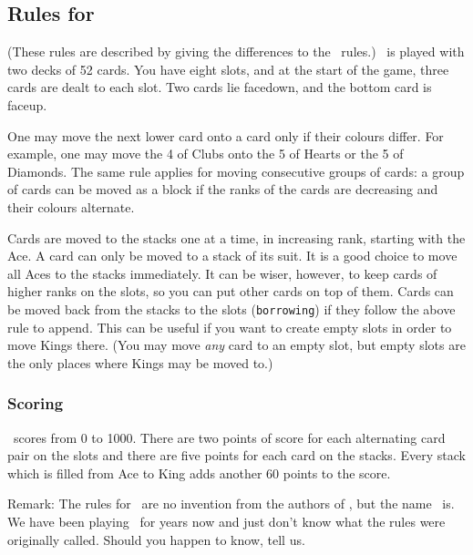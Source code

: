 \subsection{Rules for \gypsy}
(These rules are described by giving the differences to the \spider\ rules.)
\gypsy\ is played with two decks of 52 cards. You have eight slots,
and at the start of the game, three cards are dealt to each slot. Two cards
lie facedown, and the bottom card is faceup.

One may move the next lower card onto a card only if their colours differ.
For example, one may move the 4 of Clubs onto the 5 of Hearts or the 5
of Diamonds. The same rule applies for moving consecutive groups of cards:
a group of cards can be moved as a block if the ranks of the cards are
decreasing and their colours alternate.

Cards are moved to the stacks one at a time, in increasing rank, starting with
the Ace.  A card can only be moved to a stack of its suit.  It is a good choice
to move all Aces to the stacks immediately.  It can be wiser, however, to keep
cards of higher ranks on the slots, so you can put other cards on top of them.
Cards can be moved back from the stacks to the slots ({\tt borrowing}) if they
follow the above rule to append.  
This can be useful if you want to create empty slots in order to move Kings
there.
(You may move {\em any\/} card to an empty slot, but empty slots are the only
places where Kings may be moved to.)

\subsubsection*{Scoring}
\gypsy\ scores from 0 to 1000. There are two points of score for each
alternating card pair on the slots and
there are five points for each card on the stacks.
Every stack which is filled from Ace to King adds another 60 points
to the score.

\bigskip
Remark: The rules for \gypsy\ are no invention from the authors of \xpat, but
the name \gypsy\ is. We have been playing \gypsy\ for years now and just don't
know what the rules were originally called. Should you happen to know,
tell us.


